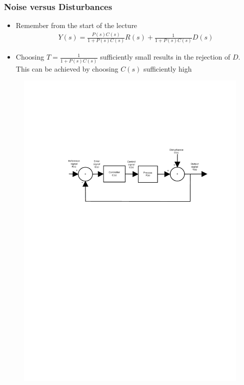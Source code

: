 \begin{frame}
	\frametitle{Noise versus Disturbances}
	\begin{itemize}
		\item Remember from the start of the lecture
		\begin{align*}
			Y(s) = \frac{P(s)C(s)}{1+P(s)C(s)}R(s) + \frac{1}{1+P(s)C(s)}D(s)
		\end{align*}
		\item Choosing $T=\frac{1}{1+P(s)C(s)}$ sufficiently small results in the rejection of $D$. This can be achieved by choosing $C(s)$ sufficiently high
	\end{itemize}
	\begin{figure}
\centering
\includegraphics[width=0.7\linewidth]{Closed-Loop}
\label{fig:Closed-Loop4}
\end{figure}

\end{frame}


